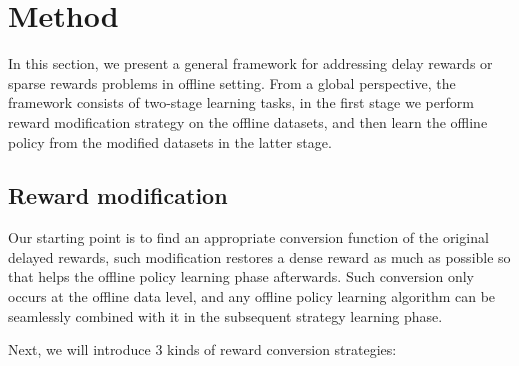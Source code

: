 \section{Method}{\label{sec: method}}

In this section, we present a general framework for addressing delay rewards or sparse rewards problems in offline setting. From a global perspective, the framework consists of two-stage learning tasks, in the first stage we perform reward modification strategy on the offline datasets, and then learn the offline policy from the modified datasets in the latter stage.

\subsection{Reward modification} 

Our starting point is to find an appropriate conversion function of the original delayed rewards, such modification restores a dense reward as much as possible so that helps the offline policy learning phase afterwards. Such conversion only occurs at the offline data level, and any offline policy learning algorithm can be seamlessly combined with it in the subsequent strategy learning phase.

Next, we will introduce 3 kinds of reward conversion strategies:

